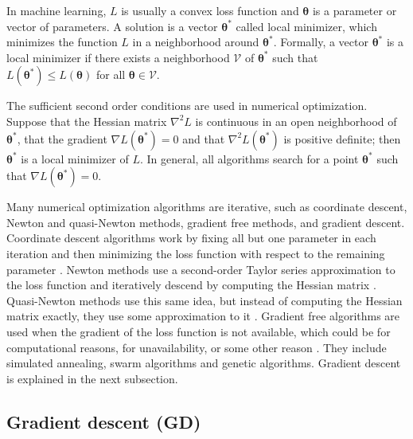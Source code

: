 In machine learning, $L$ is usually a convex loss function and $\boldsymbol{\theta}$ is a parameter or vector of parameters. A solution is a vector $\boldsymbol{\theta}^*$ called local minimizer, which minimizes the function $L$ in a neighborhood around $\boldsymbol{\theta}^*$. Formally, a vector $\boldsymbol{\theta}^*$ is a local minimizer if there exists a neighborhood $\mathcal{V}$ of $\boldsymbol{\theta}^*$ such that $L(\boldsymbol{\theta}^*) \leq L(\boldsymbol{\theta})$ for all $\boldsymbol{\theta} \in \mathcal{V}$.

The sufficient second order conditions are used in numerical optimization. Suppose that the Hessian matrix $\nabla^2 L$ is continuous in an open neighborhood of $\boldsymbol{\theta}^*$, that the gradient $\nabla L(\boldsymbol{\theta}^*) = 0$ and that $\nabla^2 L(\boldsymbol{\theta}^*)$ is positive definite; then $\boldsymbol{\theta}^*$ is a local minimizer of $L$. In general, all algorithms search for a point $\boldsymbol{\theta}^*$ such that $\nabla L(\boldsymbol{\theta}^*) = 0$.

Many numerical optimization algorithms are iterative, such as coordinate descent, Newton and quasi-Newton methods, gradient free methods, and gradient descent. Coordinate descent algorithms work by fixing all but one parameter in each iteration and then minimizing the loss function with respect to the remaining parameter \cite{friedman2007pathwise} \cite{wright2015coordinate}.
Newton methods use a second-order Taylor series approximation to the loss function and iteratively descend by computing the Hessian matrix \cite[p.~22]{nocedal2006numerical}. Quasi-Newton methods use this same idea, but instead of computing the Hessian matrix exactly, they use some approximation to it \cite{byrd1995limited} \cite[p.~23]{nocedal2006numerical}.
Gradient free algorithms are used when the gradient of the loss function is not available, which could be for computational reasons, for unavailability, or some other reason \cite{rios2013derivative}. They include simulated annealing, swarm algorithms and genetic algorithms.
Gradient descent is explained in the next subsection.

\subsection{Gradient descent (GD)}

